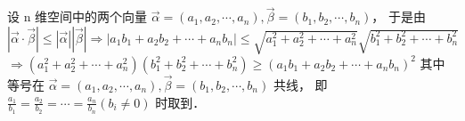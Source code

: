 设 n 维空间中的两个向量 $\vec{\alpha}=\left(a_{1}, a_{2}, \cdots, a_{n}\right), \vec{\beta}=\left(b_{1}, b_{2}, \cdots, b_{n}\right)$，
于是由 $|\vec{\alpha} \cdot \vec{\beta}| \leq|\vec{\alpha}||\vec{\beta}| \Rightarrow\left|a_{1} b_{1}+a_{2} b_{2}+\cdots+a_{n} b_{n}\right| \leq \sqrt{a_{1}^{2}+a_{2}^{2}+\cdots+a_{n}^{2}} \sqrt{b_{1}^{2}+b_{2}^{2}+\cdots+b_{n}^{2}}$
$\Rightarrow\left(a_{1}^{2}+a_{2}^{2}+\cdots+a_{n}^{2}\right)\left(b_{1}^{2}+b_{2}^{2}+\cdots+b_{n}^{2}\right) \geq\left(a_{1} b_{1}+a_{2} b_{2}+\cdots+a_{n} b_{n}\right)^{2}$
其中等号在 $\vec{\alpha}=\left(a_{1}, a_{2}, \cdots, a_{n}\right), \vec{\beta}=\left(b_{1}, b_{2}, \cdots, b_{n}\right)$ 共线， 即 $\frac{a_{1}}{b_{1}}=\frac{a_{2}}{b_{2}}=\cdots=\frac{a_{n}}{b_{n}}\left(b_{i} \neq 0\right)$ 时取到．


